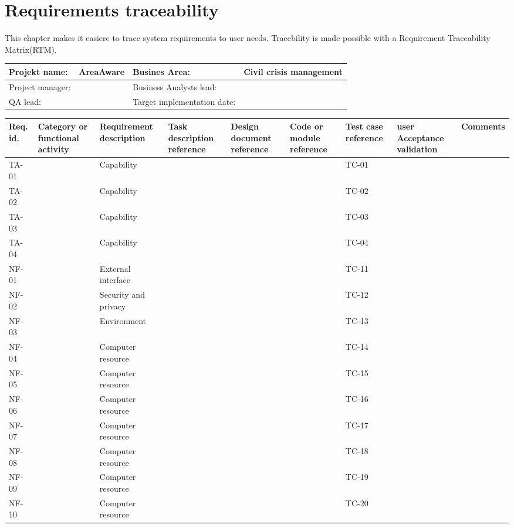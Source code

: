 \label{chp_requirementsTraceability}
\chapter{Requirements traceability}
This chapter makes it easiere to trace system requirements to user needs. Tracebility is made possible with a Requirement Traceability Matrix(RTM).

\begin{sidewaystable}
	\begin{longtable}{| p{3.5cm}  | p{5cm} |  p{3.5cm}  | p{7.8cm} |  }
		\hline
		Projekt name: 	& AreaAware & Busines Area:	& Civil crisis management \\ \hline
		Project manager:& & Business Analysts lead: 	& \\ \hline
		QA lead: 		& & Target implementation date:	& \\ \hline
	\end{longtable}
	\begin{longtable}{| p{1.1cm}  | p{2cm}  | p{5cm} |  p{1.5cm}  | p{1.5cm}  |  p{1.5cm}  | p{1.5cm}  |  p{1.5cm}  | p{2cm}  |  } \hline
		Req. id. 	& Category or functional activity & Requirement description & Task description reference & Design document reference & Code or module reference & Test case reference & user Acceptance validation & Comments \\ \hline
		TA-01&& Capability&&&& TC-01 && \\ \hline
		TA-02&& Capability&&&& TC-02 && \\ \hline
		TA-03&& Capability&&&& TC-03 && \\ \hline
		TA-04&& Capability&&&& TC-04 && \\ \hline
		NF-01&& External interface&&&& TC-11 && \\ \hline
		NF-02&& Security and privacy&&&& TC-12 && \\ \hline
		NF-03&& Environment&&&& TC-13 && \\ \hline
		NF-04&& Computer resource&&&& TC-14 && \\ \hline
		NF-05&& Computer resource&&&& TC-15 && \\ \hline
		NF-06&& Computer resource&&&& TC-16 && \\ \hline
		NF-07&& Computer resource&&&& TC-17 && \\ \hline
		NF-08&& Computer resource&&&& TC-18 && \\ \hline
		NF-09&& Computer resource&&&& TC-19 && \\ \hline
		NF-10&& Computer resource&&&& TC-20 && \\ \hline

\end{longtable}
\end{sidewaystable}
